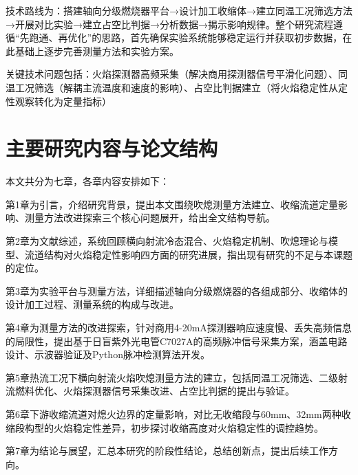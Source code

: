 技术路线为：搭建轴向分级燃烧器平台→设计加工收缩体→建立同温工况筛选方法→开展对比实验→建立占空比判据→分析数据→揭示影响规律。整个研究流程遵循“先跑通、再优化”的思路，首先确保实验系统能够稳定运行并获取初步数据，在此基础上逐步完善测量方法和实验方案。

关键技术问题包括：火焰探测器高频采集（解决商用探测器信号平滑化问题）、同温工况筛选（解耦主流温度和速度的影响）、占空比判据建立（将火焰稳定性从定性观察转化为定量指标）

\section{主要研究内容与论文结构}

本文共分为七章，各章内容安排如下：

第1章为引言，介绍研究背景，提出本文围绕吹熄测量方法建立、收缩流道定量影响、测量方法改进探索三个核心问题展开，给出全文结构导航。

第2章为文献综述，系统回顾横向射流冷态混合、火焰稳定机制、吹熄理论与模型、流道结构对火焰稳定性影响四方面的研究进展，指出现有研究的不足与本课题的定位。

第3章为实验平台与测量方法，详细描述轴向分级燃烧器的各组成部分、收缩体的设计加工过程、测量系统的构成与改进。

第4章为测量方法的改进探索，针对商用4-20mA探测器响应速度慢、丢失高频信息的局限性，提出基于日盲紫外光电管C7027A的高频脉冲信号采集方案，涵盖电路设计、示波器验证及Python脉冲检测算法开发。

第5章热流工况下横向射流火焰吹熄测量方法的建立，包括同温工况筛选、二级射流燃料优化、火焰探测器信号采集改进、占空比判据的提出与验证。

第6章下游收缩流道对熄火边界的定量影响，对比无收缩段与60mm、32mm两种收缩段构型的火焰稳定性差异，初步探讨收缩高度对火焰稳定性的调控趋势。

第7章为结论与展望，汇总本研究的阶段性结论，总结创新点，提出后续工作方向。